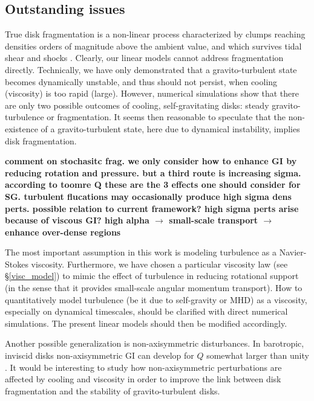 \subsection{Outstanding issues}
True disk fragmentation is a non-linear process characterized by clumps   
reaching densities orders of magnitude above the ambient value, and
which survives tidal shear and shocks \citep{paardekooper12,young16}.  
Clearly, our linear models cannot address fragmentation
directly. Technically, we have only demonstrated that a 
gravito-turbulent state becomes dynamically unstable, and thus should
not persist, when cooling (viscosity) is too rapid (large).  
However, numerical simulations show that there are only two
possible outcomes of cooling, self-gravitating disks: steady
gravito-turbulence or fragmentation. It seems then reasonable to 
speculate that the non-existence of a gravito-turbulent state, here due to
dynamical instability, implies disk fragmentation.  

{\bf comment on stochasitc frag. we only consider 
how to enhance GI by reducing rotation and pressure. but a third route is 
increasing sigma. according to toomre Q these are the 3 effects one should consider
for SG. turbulent flucations may occasionally produce high sigma dens perts. 
possible relation to current framework? high sigma perts arise because of viscous GI? 
high alpha $\to$ small-scale transport $\to$ enhance over-dense regions}





The most important assumption in this work is modeling turbulence as a  
Navier-Stokes viscosity. Furthermore, we have chosen a particular  
viscosity law (see \S\ref{visc_model}) to mimic the effect of 
turbulence in reducing rotational support (in the sense that it
provides small-scale angular momentum transport). 
How to quantitatively model turbulence (be it due to self-gravity or
MHD) as a viscosity, especially on dynamical timescales, should be
clarified with direct numerical simulations. The present linear models
should then be modified accordingly. 

Another possible generalization is non-axisymmetric
disturbances. In barotropic, inviscid disks  
non-axisymmetric GI can develop for $Q$ somewhat larger than unity
\citep{papaloizou89,papaloizou91}. It would be interesting to study
how non-axisymmetric perturbations are affected by cooling and
viscosity in order to improve %
the link between disk fragmentation and the
stability of gravito-turbulent disks.   

